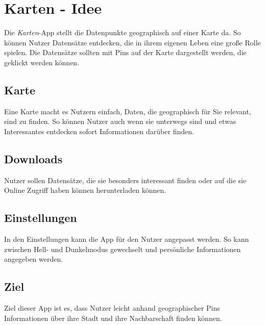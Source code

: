 \section{Karten - Idee}
Die \emph{Karten}-App stellt die Datenpunkte geographisch auf einer Karte da. So können Nutzer Datensätze entdecken, die in ihrem eigenen Leben eine große Rolle spielen. Die Datensätze sollten mit Pins auf der Karte dargestellt werden, die geklickt werden können. 
\subsection{Karte}
Eine Karte macht es Nutzern einfach, Daten, die geographisch für Sie relevant, sind zu finden. So können Nutzer auch wenn sie unterwegs sind und etwas Interessantes entdecken sofort Informationen darüber finden.

\subsection{Downloads}
Nutzer sollen Datensätze, die sie besonders interessant finden oder auf die sie Online Zugriff haben können herunterladen können.

\subsection{Einstellungen}
In den Einstellungen kann die App für den Nutzer angepasst werden. So kann zwischen Hell- und Dunkelmodus gewechselt und persönliche Informationen angegeben werden.

\subsection{Ziel}
Ziel dieser App ist es, dass Nutzer leicht anhand geographischer Pins Informationen über ihre Stadt und ihre Nachbarschaft finden können.